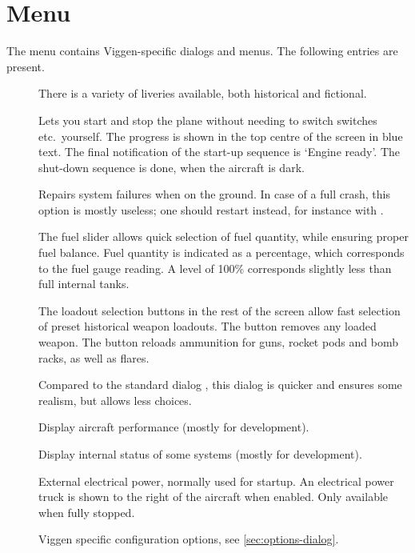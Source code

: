 \documentclass[a4paper]{report}
\newcommand{\JAonly}[1]{\ifbool{AJS}{}{#1}}
\newcommand{\variant}{\ifbool{AJS}{AJS 37}{JA 37D}}
\begin{document}
\section{\variant{} Menu}
The menu  contains Viggen-specific dialogs and menus.
The following entries are present.
\begin{description}
  \item[] There is a variety of liveries available, both historical and fictional.
  \item[] Lets you start and stop the plane without needing to switch switches etc.\ yourself.
    The progress is shown in the top centre of the screen in blue text.
    The final notification of the start-up sequence is `Engine ready'.
    The shut-down sequence is done, when the aircraft is dark.
  \item[] Repairs system failures when on the ground.
    In case of a full crash, this option is mostly useless;
    one should restart instead, for instance with .
  \item[] The fuel slider allows quick selection of fuel quantity,
    while ensuring proper fuel balance.
    Fuel quantity is indicated as a percentage, which corresponds to the fuel gauge reading.
    A level of 100\% corresponds slightly less than full internal tanks.

    The loadout selection buttons in the rest of the screen allow
    fast selection of preset historical weapon loadouts.
    The button  removes any loaded weapon.
    The button  reloads ammunition
    for guns, rocket pods and bomb racks, as well as flares.

    Compared to the standard dialog ,
    this dialog is quicker and ensures some realism, but allows less choices.
  \item[] Display aircraft performance (mostly for development).
  \item[] Display internal status of some systems (mostly for development).
  \item[] External electrical power, normally used for startup.
    An electrical power truck is shown to the right of the aircraft when enabled.
    Only available when fully stopped.
  \item[] Viggen specific configuration options, see \cref{sec:options-dialog}.
\end{description}
\end{document}
